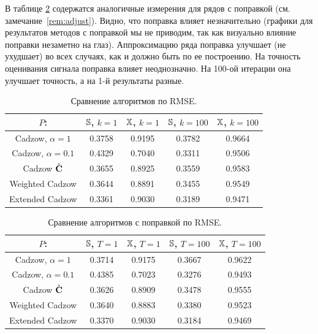 \documentclass[12pt,a4paper,fleqn,leqno]{article}
\begin{document}
В таблице \ref{fintable_improved} содержатся аналогичные измерения для рядов с поправкой (см. замечание~\ref{rem:adjust}).
Видно, что поправка влияет незначительно (графики для результатов методов с поправкой мы не приводим, так как визуально влияние поправки незаметно на глаз). Аппроксимацию ряда поправка улучшает (не ухудшает) во всех случаях,
как и должно быть по ее построению. На точность оценивания сигнала поправка влияет неоднозначно. На 100-ой итерации она улучшает точность,
а на 1-й результаты разные. 

\begin{table}[!hhh]
\begin{center}
\caption{Сравнение алгоритмов по RMSE.}\label{fintable}
\begin{tabular}{|c|c|c|c|c|}
\hline
$P$: & $\mathbb{S}$, $k = 1$ & $\mathbb{X}$, $k = 1$ & $\mathbb{S}$, $k = 100$ & $\mathbb{X}$, $k = 100$  \\
\hline
Cadzow, $\alpha = 1$ & 0.3758 & 0.9195 & 0.3782 & 0.9664 \\
\hline
Cadzow, $\alpha = 0.1$ & 0.4329 & 0.7040 & 0.3311 & 0.9506 \\
\hline
Cadzow $\hat{\mathbf{C}}$ & 0.3655 & 0.8925 & 0.3559 & 0.9583 \\
\hline
Weighted Cadzow & 0.3644 & 0.8891 & 0.3455 & 0.9549 \\
\hline
Extended Cadzow & 0.3361 & 0.9030 & 0.3189 & 0.9471 \\
\hline
\end{tabular}
\end{center}
\end{table}

\begin{table}[!hhh]
	\begin{center}
		\caption{Сравнение алгоритмов с поправкой по RMSE.}\label{fintable_improved}
		\begin{tabular}{|c|c|c|c|c|}
			\hline
			$P$: & $\mathbb{S}$, $T = 1$ & $\mathbb{X}$, $T = 1$ & $\mathbb{S}$, $T = 100$ & $\mathbb{X}$, $T = 100$  \\
			\hline
			Cadzow, $\alpha = 1$ & 0.3714 & 0.9175 & 0.3667 & 0.9622 \\
			\hline
			Cadzow, $\alpha = 0.1$ & 0.4385 & 0.7023 & 0.3276 & 0.9493 \\
			\hline
			Cadzow $\hat{\mathbf{C}}$ & 0.3626 & 0.8909 & 0.3478 & 0.9555 \\
			\hline
			Weighted Cadzow & 0.3640 & 0.8883 & 0.3380 & 0.9523 \\
			\hline
			Extended Cadzow & 0.3370 & 0.9030 & 0.3184 & 0.9469 \\
			\hline
		\end{tabular}
	\end{center}
\end{table}
\end{document}
